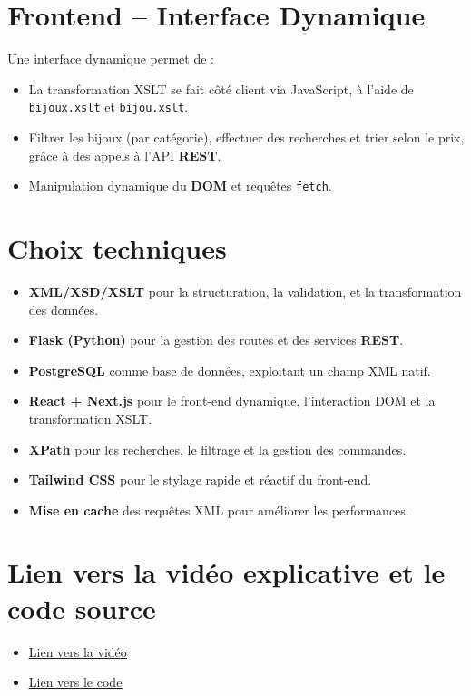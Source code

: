 \documentclass[14pt]{extarticle}
\begin{document}
\section*{Frontend – Interface Dynamique}
Une interface dynamique permet de :
\begin{itemize}[label=-]
    \item La transformation XSLT se fait côté client via JavaScript, à l’aide de \texttt{bijoux.xslt} et \texttt{bijou.xslt}.
    \item Filtrer les bijoux (par catégorie), effectuer des recherches et trier selon le prix, grâce à des appels à l’API \textbf{REST}.
    \item Manipulation dynamique du \textbf{DOM} et requêtes \texttt{fetch}.
\end{itemize}
\section*{Choix techniques}
\begin{itemize} [label =-]
    \item \textbf{XML/XSD/XSLT} pour la structuration, la validation, et la transformation des données.
    \item \textbf{Flask (Python)} pour la gestion des routes et des services \textbf{REST}.
    \item \textbf{PostgreSQL} comme base de données, exploitant un champ XML natif.
    \item \textbf{React + Next.js} pour le front-end dynamique, l’interaction DOM et la transformation XSLT.
     \item \textbf{XPath} pour les recherches, le filtrage et la gestion des commandes.
     \item \textbf{Tailwind CSS} pour le stylage rapide et réactif du front-end.
     \item \textbf{Mise en cache} des requêtes XML pour améliorer les performances.
\end{itemize}
\section*{ Lien vers la vidéo explicative et le code source}
\begin{itemize}[label= ]
    \item\href{https://drive.google.com/file/d/1js70yp9zMGgbiwFzuWCpGEhvx22dAf4N/view?usp=share_link}{\uline{Lien vers la vidéo}}
    \item \href{https://github.com/ikrammedj/Verron-Jewelry}{\uline{Lien vers le code}}  
\end{itemize}
\end{document}
